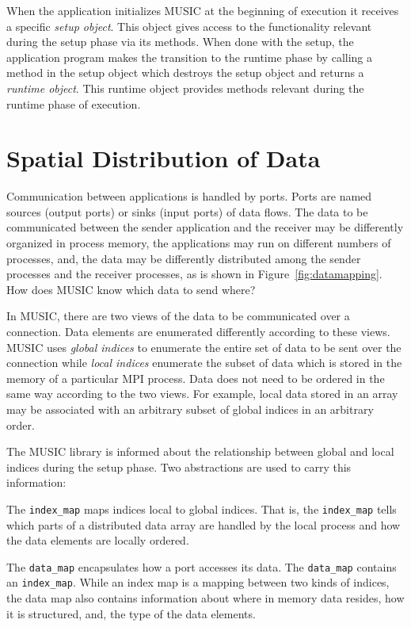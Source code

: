 \documentclass[a4paper]{report}
\begin{document}
When the application initializes MUSIC at the beginning of execution
it receives a specific \emph{setup object}.  This object gives access
to the functionality relevant during the setup phase via its methods.
When done with the setup, the application program makes the transition
to the runtime phase by calling a method in the setup object which
destroys the setup object and returns a \emph{runtime object}.  This
runtime object provides methods relevant during the runtime phase of
execution.

\section{Spatial Distribution of Data}

Communication between applications is handled by ports.  Ports are
named sources (output ports) or sinks (input ports) of data flows.
The data to be communicated between the sender application and the
receiver may be differently organized in process memory, the
applications may run on different numbers of processes, and, the data
may be differently distributed among the sender processes and the
receiver processes, as is shown in Figure~\ref{fig:datamapping}.  How
does MUSIC know which data to send where?

In MUSIC, there are two views of the data to be communicated over a
connection.  Data elements are enumerated differently according to
these views.  MUSIC uses \emph{global indices} to
enumerate the entire set of data to be sent over the connection while
\emph{local indices} enumerate the subset of data
which is stored in the memory of a particular MPI process.  Data does
not need to be ordered in the same way according to the two views.
For example, local data stored in an array may be associated with an
arbitrary subset of global indices in an arbitrary order.

The MUSIC library is informed about the relationship between global
and local indices during the setup phase.  Two abstractions are used
to carry this information:

The \lstinline|index_map| maps indices local to global indices.  That
is, the \lstinline|index_map| tells which parts of a distributed data
array are handled by the local process and how the data elements are
locally ordered.

The \lstinline|data_map| encapsulates how a port accesses its data.
The \lstinline|data_map| contains an \lstinline|index_map|.  While an
index map is a mapping between two kinds of indices, the data map also
contains information about where in memory data resides, how it is
structured, and, the type of the data elements.
\end{document}
